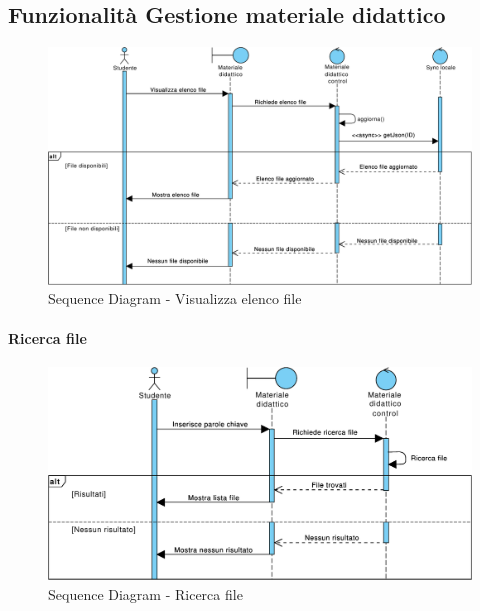 \subsection{Funzionalità Gestione materiale didattico}

\begin{figure}
	\centering
	\includegraphics[width=6.5in]{imgs/gruppo1/sequence_diagrams/SD13_visualizza_elenco_file.pdf}
	\caption{Sequence Diagram - Visualizza elenco file}
	\label{diag:visualizzaElencoFileSD}
\end{figure}

\paragraph{Ricerca file}
\begin{figure}
	\centering
	\includegraphics[width=6.5in]{imgs/gruppo1/sequence_diagrams/SD14_ricerca_file.pdf}
	\caption{Sequence Diagram - Ricerca file}
	\label{diag:ricercaFileSD}
\end{figure}
\newpage

